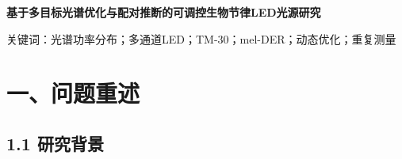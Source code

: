 \documentclass[UTF8,a4paper,12pt]{ctexart}
\begin{document}
\begin{center}\LARGE\bfseries 基于多目标光谱优化与配对推断的可调控生物节律LED光源研究\end{center}

\begin{abstract}

面向兼顾视觉质量与非视觉生物效应的可调光LED设计，本文建立从光谱功率分布到颜色表观、节律刺激、动态配光和睡眠效应检验的一体化模型。首先在380～780 nm、1 nm间隔上对光谱离散积分，结合CIE 1931、CIE 1960 UCS、ANSI/IES TM-30-18和CIE S 026，计算相关色温CCT、色偏差Duv、保真度指数Rf、色域指数Rg及黑视素日光效能比mel-DER；随后把五通道混光写成单纯形约束下的线性组合，并针对日间与夜间场景构造不同目标函数。

问题一中，实测LED的CCT为3903.03 K、Duv为-0.001017、Rf为91.79、Rg为106.08、mel-DER为0.6407，表明其颜色保真度较高、平均色域略扩张，节律刺激低于等光视效应的D65。问题二中，日间模式在满足CCT、Duv、Rf和Rg约束后取得Rf=92.86、mel-DER=0.8362；夜间模式在维持Rf=88.70的同时将mel-DER降至0.3668。两种最优解均落在允许色温区间的下边界，揭示了目标函数对约束边界的主动利用。

问题三以题目指定的08:30～19:30为控制时段，建立同时考虑归一化光谱形状、CCT、Duv、mel-DER和相邻时刻权重变化的动态损失。12个时刻的平均归一化SPD均方根误差为0.001498，平均CCT绝对误差为111.73 K，平均mel-DER绝对误差为0.0883；最大相邻权重步长为0.3033，出现在19:30前的暮光转折。结果说明五通道可稳定跟随日间变化，但在低色温暮光阶段存在由光谱基底不足导致的重构上限。

问题四对11名被试、3种环境的重复测量数据采用Friedman总体检验，并对显著终点实施Wilcoxon配对检验、Holm校正、秩二列效应量和配对bootstrap置信区间。仅N3比例总体差异显著（$\chi^2$=7.0909，p=0.0289，Kendall's W=0.322）；A相对C的均值差为-5.649个百分点，Holm校正p=0.0205，95\%置信区间为[-8.846，-2.353]。在附件缺少条件映射、且数据为随机生成的边界下，现有证据不支持优化光照全面改善睡眠。本文模型提供了可复算、可约束、可审计的LED节律照明设计流程，并明确给出工程适用范围与统计解释边界。

\end{abstract}

关键词：光谱功率分布；多通道LED；TM-30；mel-DER；动态优化；重复测量

\section{一、问题重述}

\subsection{1.1 研究背景}
\end{document}
